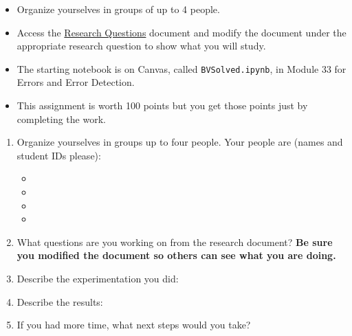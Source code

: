 \documentclass[12pt]{article}
\begin{document}

\begin{itemize}
    \item Organize yourselves in groups of up to 4 people.
    \item Access the \href{https://docs.google.com/document/d/1gwp3NOt7oRPQ2ymmrp5rFvVzPTFJ6iV4FJLHPvpXlO8/edit?usp=sharing}{Research Questions} document and modify the document under the appropriate research question to show what you will study.
    \item The starting notebook is on Canvas, called \texttt{BVSolved.ipynb}, in Module 33 for Errors and Error Detection.
    \item This assignment is worth 100 points but you get those points just by completing the work.
\end{itemize}

\begin{enumerate}[font=\bfseries]

\item Organize yourselves in groups up to four people.  Your people are (names and student IDs please):
\begin{itemize}
    \item \Blank[4in]{}
    \item \Blank[4in]{}
    \item \Blank[4in]{}
    \item \Blank[4in]{}
\end{itemize}
\item What questions are you working on from the research document?
\textbf{Be sure you modified the document so others can see what you are doing.}
\LeaveSpace[3in]{}
\item Describe the experimentation you did:
\LeaveSpace[3in]{}
\item Describe the results:
\LeaveSpace[4in]{}

\item If you had more time, what next steps would you take?
\end{enumerate}
\end{document}
